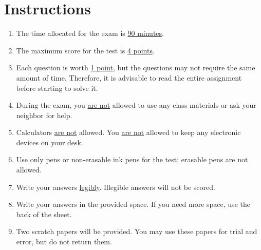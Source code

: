 \section*{Instructions}
\begin{enumerate}
    \item The time allocated for the exam is \underline{90 minutes}.
    \item The maximum score for the test is \underline{4 points}.
    \item Each question is worth \underline{1 point}, but the questions may not require the same amount of time. Therefore, it is advisable to read the entire assignment before starting to solve it. 
    \item During the exam, you \underline{are not} allowed to use any class materials or ask your neighbor for help.
    \item Calculators \underline{are not} allowed. You \underline{are not} allowed to keep any electronic devices on your desk.
    \item Use only pens or non-erasable ink pens for the test; erasable pens are not allowed.
    \item Write your answers \underline{legibly}. Illegible answers will not be scored.
    \item Write your answers in the provided space. If you need more space, use the back of the sheet.
    \item Two scratch papers will be provided. You may use these papers for trial and error, but do not return them.
    \vfill
\end{enumerate}